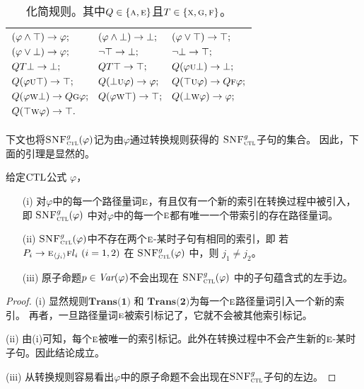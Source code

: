 \begin{table}[h!]%
	\centering\caption{化简规则。其中$Q\in \{\textsc{a}, \textsc{e}\}$且$T\in \{\textsc{x},\textsc{g},\textsc{f}\}$。}\label{tab:simp}
	\begin{tabular}{c}
		\toprule
		$
		\begin{aligned}
						& (\varphi \wedge \top) \rightarrow \varphi;
						&&	(\varphi \wedge \bot) \rightarrow \bot;
						&&  (\varphi \vee \top) \rightarrow \top;\\
						& (\varphi \vee \bot) \rightarrow \varphi; 
						&&  \neg \top \rightarrow \bot; 
						&& \neg \bot \rightarrow \top; \\
						&  QT \bot \rightarrow \bot; 
						&& QT \top \rightarrow \top;  
						&& Q(\varphi \textsc{u} \bot) \rightarrow \bot;\\
						& Q(\varphi \textsc{u} \top) \rightarrow \top;
						&& Q(\bot \textsc{u} \varphi) \rightarrow \varphi;
						&& Q(\top \textsc{u} \varphi) \rightarrow Q\textsc{f} \varphi;\\
						& Q(\varphi \textsc{w} \bot) \rightarrow Q\textsc{g} \varphi;
						&& Q(\varphi \textsc{w} \top) \rightarrow \top; 
						&& Q(\bot \textsc{w} \varphi) \rightarrow \varphi;\\
						& Q(\top \textsc{w} \varphi) \rightarrow \top.
		\end{aligned}
		$\\
		\bottomrule
	\end{tabular}
\end{table}

下文也将${\textsc{SNF}_{\textsc{ctl}}^g}(\varphi)$记为由$\varphi$通过转换规则获得的 ${\textsc{SNF}_{\textsc{ctl}}^g}$子句的集合。
因此，下面的引理是显然的。


\begin{lemma} \label{lem:ResTransPt}
	给定$\textrm{CTL}$公式 $\varphi$，
	\begin{itemize}
		\item[(i)] 对$\varphi$中的每一个路径量词$\textsc{e}$，有且仅有一个新的索引在转换过程中被引入，即 ${\textsc{SNF}_{\textsc{ctl}}^g}(\varphi)$ 中对$\varphi$中的每一个$\textsc{e}$都有唯一一个带索引的存在路径量词。
		\item[(ii)] ${\textsc{SNF}_{\textsc{ctl}}^g}(\varphi)$中不存在两个$\textsc{e}$-某时子句有相同的索引，即
		若 $P_i\rightarrow \textsc{e}_{{\langle{j_i}\rangle}}\textsc{f} l_i~(i=1,2)$ 在 ${\textsc{SNF}_{\textsc{ctl}}^g}(\varphi)$ 中，则
		$j_1\neq j_2$。
		\item[(iii)] 原子命题$p \in\textit{Var}(\varphi)$不会出现在 ${\textsc{SNF}_{\textsc{ctl}}^g}(\varphi)$ 中的子句蕴含式的左手边。
	\end{itemize}
\end{lemma}
\begin{proof}
	(i) 显然规则$\textbf{Trans(1)}$ 和 $\textbf{Trans(2)}$为每一个$\textsc{e}$路径量词引入一个新的索引。 
	再者，一旦路径量词$\textsc{e}$被索引标记了，它就不会被其他索引标记。
	
	(ii) 由(i)可知，每个$\textsc{e}$被唯一的索引标记。此外在转换过程中不会产生新的$\textsc{e}$-某时子句。因此结论成立。
	
	(iii) 从转换规则容易看出$\varphi$中的原子命题不会出现在${\textsc{SNF}_{\textsc{ctl}}^g}$子句的左边。
\end{proof}

